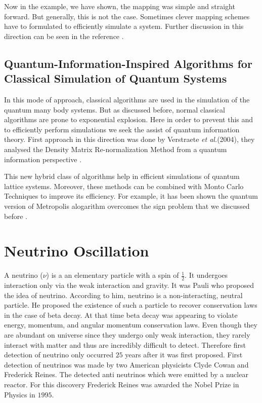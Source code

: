 \documentclass[12pt,a4paper]{report}
\begin{document}
Now in the example, we have shown, the mapping was simple and straight forward. But generally, this is not the case. Sometimes clever mapping schemes have to formulated to efficiently simulate a system. Further discussion in this direction can be seen in the reference \cite{georgescu}.

\section{ Quantum-Information-Inspired Algorithms for Classical Simulation of Quantum Systems }
In this mode of approach, classical algorithms are used in the simulation of the quantum many body systems. But as discussed before, normal classical algorithms are prone to exponential explosion. Here in order to prevent this and to efficiently perform simulations we seek the assist of quantum information theory. First approach in this direction was done by Verstraete \emph{et al.}(2004), they analysed the Density Matrix Re-normalization Method from a quantum information perspective \cite{cirac}.\par This new hybrid class of algorithms help in efficient simulations of quantum lattice systems. Moreover, these methods can be combined with Monto Carlo Techniques to improve its efficiency. For example, it has been shown the quantum version of Metropolis alogarithm overcomes the sign problem that we discussed before \cite{temme2011}.
\newpage
\thispagestyle{empty}
\mbox{}
\newpage


\chapter{Neutrino Oscillation}\label{sec2}

A neutrino  ($\nu$) is a an elementary particle with a spin of $\frac{1}{2}$. It undergoes interaction only via the weak interaction and gravity. It was Pauli who proposed the idea of neutrino. According to him, neutrino is a non-interacting, neutral particle. He proposed the existence of such a particle to recover conservation laws in the case of beta decay. At that time beta decay was appearing to violate energy, momentum, and angular momentum conservation laws. Even though they are abundant on universe since they undergo only weak interaction, they rarely interact with matter and thus are incredibly difficult to detect. Therefore first detection of neutrino only occurred $25$ years after it was first proposed. First detection of neutrinos was made by two American physicists Clyde Cowan and Frederick Reines. The detected anti neutrinos which were emitted by a nuclear reactor. For this discovery Frederick Reines was awarded the Nobel Prize in Physics in $1995$. \par
\end{document}
